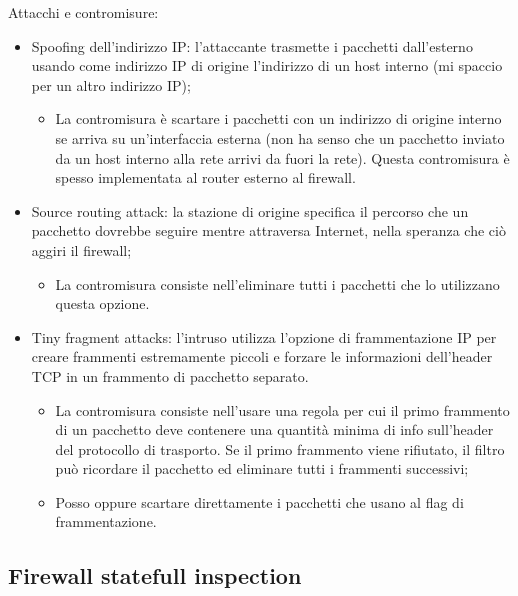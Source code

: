 Attacchi e contromisure:
\begin{itemize}
    \item Spoofing dell'indirizzo IP: l'attaccante trasmette i pacchetti dall'esterno usando come indirizzo IP di origine l'indirizzo di un host interno (mi spaccio per un altro indirizzo IP);
	\begin{itemize}
	    \item La contromisura è scartare i pacchetti con un indirizzo di origine interno se arriva su un'interfaccia esterna (non ha senso che un pacchetto inviato da un host interno alla rete arrivi da fuori la rete). Questa contromisura è spesso implementata al router esterno al firewall.
	\end{itemize}
	\item Source routing attack: la stazione di origine specifica il percorso che un pacchetto dovrebbe seguire mentre attraversa Internet, nella speranza che ciò aggiri il firewall;
	\begin{itemize}
	    \item La contromisura consiste nell'eliminare tutti i pacchetti che lo utilizzano questa opzione.
	\end{itemize}
	\item Tiny fragment attacks: l'intruso utilizza l'opzione di frammentazione IP per creare frammenti estremamente piccoli e forzare le informazioni dell'header TCP in un frammento di pacchetto separato.
	\begin{itemize}
	    \item La contromisura consiste nell'usare una regola per cui il primo frammento di un pacchetto deve contenere una quantità minima di info sull'header del protocollo di trasporto. Se il primo frammento viene rifiutato, il filtro può ricordare il pacchetto ed eliminare tutti i frammenti successivi;
		\item Posso oppure scartare direttamente i pacchetti che usano al flag di frammentazione.
	\end{itemize}
\end{itemize}

\subsection{Firewall statefull inspection}

